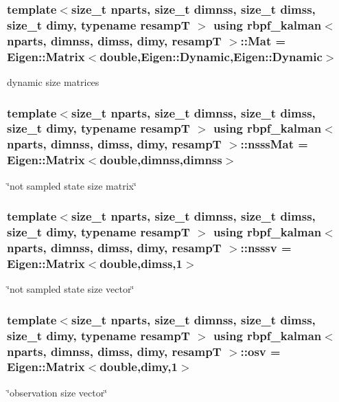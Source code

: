 \subsubsection[{\texorpdfstring{Mat}{Mat}}]{\setlength{\rightskip}{0pt plus 5cm}template$<$size\+\_\+t nparts, size\+\_\+t dimnss, size\+\_\+t dimss, size\+\_\+t dimy, typename resampT $>$ using {\bf rbpf\+\_\+kalman}$<$ nparts, dimnss, dimss, dimy, resampT $>$\+::{\bf Mat} =  Eigen\+::\+Matrix$<$double,Eigen\+::\+Dynamic,Eigen\+::\+Dynamic$>$}\hypertarget{classrbpf__kalman_a042212551b46f72a5d3d58f7073d19ee}{}\label{classrbpf__kalman_a042212551b46f72a5d3d58f7073d19ee}
dynamic size matrices 
\subsubsection[{\texorpdfstring{nsss\+Mat}{nsssMat}}]{\setlength{\rightskip}{0pt plus 5cm}template$<$size\+\_\+t nparts, size\+\_\+t dimnss, size\+\_\+t dimss, size\+\_\+t dimy, typename resampT $>$ using {\bf rbpf\+\_\+kalman}$<$ nparts, dimnss, dimss, dimy, resampT $>$\+::{\bf nsss\+Mat} =  Eigen\+::\+Matrix$<$double,dimnss,dimnss$>$}\hypertarget{classrbpf__kalman_afa2599778bdaa2419739a838565df672}{}\label{classrbpf__kalman_afa2599778bdaa2419739a838565df672}
\char`\"{}not sampled state size matrix\char`\"{} 
\subsubsection[{\texorpdfstring{nsssv}{nsssv}}]{\setlength{\rightskip}{0pt plus 5cm}template$<$size\+\_\+t nparts, size\+\_\+t dimnss, size\+\_\+t dimss, size\+\_\+t dimy, typename resampT $>$ using {\bf rbpf\+\_\+kalman}$<$ nparts, dimnss, dimss, dimy, resampT $>$\+::{\bf nsssv} =  Eigen\+::\+Matrix$<$double,dimss,1$>$}\hypertarget{classrbpf__kalman_a887899234c374a04beba9669418577a7}{}\label{classrbpf__kalman_a887899234c374a04beba9669418577a7}
\char`\"{}not sampled state size vector\char`\"{} 
\subsubsection[{\texorpdfstring{osv}{osv}}]{\setlength{\rightskip}{0pt plus 5cm}template$<$size\+\_\+t nparts, size\+\_\+t dimnss, size\+\_\+t dimss, size\+\_\+t dimy, typename resampT $>$ using {\bf rbpf\+\_\+kalman}$<$ nparts, dimnss, dimss, dimy, resampT $>$\+::{\bf osv} =  Eigen\+::\+Matrix$<$double,dimy,1$>$}\hypertarget{classrbpf__kalman_a4fdeb1b9b626811569b6ac4327c6cbb2}{}\label{classrbpf__kalman_a4fdeb1b9b626811569b6ac4327c6cbb2}
\char`\"{}observation size vector\char`\"{} 
